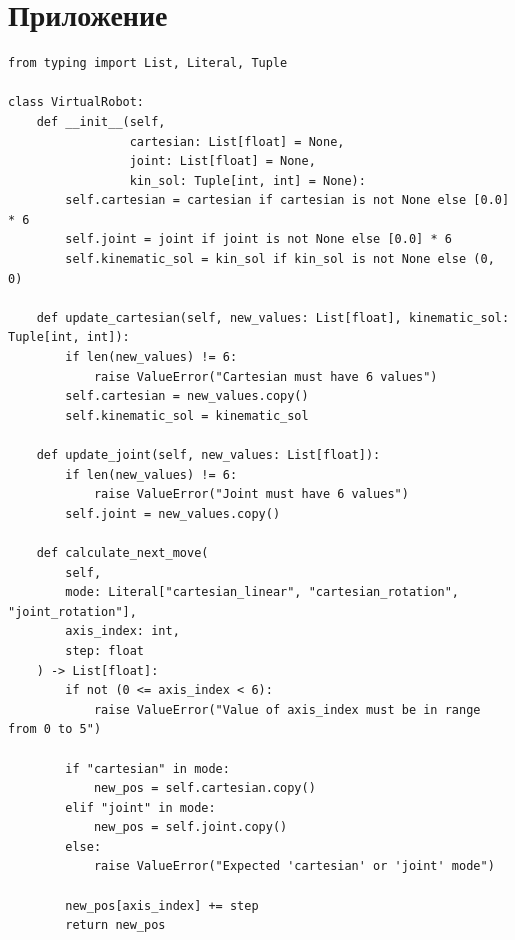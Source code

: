 \documentclass[a4paper,14pt]{extarticle}
\begin{document}
\section{Приложение}
\begin{lstlisting}[label=lst:virtualrobot, caption={Скрипт виртуального робота: сохранение координат робота и кинематической пары. Вычисление следующих координат по индексу и шагу.}]
from typing import List, Literal, Tuple

class VirtualRobot:
    def __init__(self,
                 cartesian: List[float] = None,
                 joint: List[float] = None,
                 kin_sol: Tuple[int, int] = None):
        self.cartesian = cartesian if cartesian is not None else [0.0] * 6
        self.joint = joint if joint is not None else [0.0] * 6
        self.kinematic_sol = kin_sol if kin_sol is not None else (0, 0)

    def update_cartesian(self, new_values: List[float], kinematic_sol: Tuple[int, int]):
        if len(new_values) != 6:
            raise ValueError("Cartesian must have 6 values")
        self.cartesian = new_values.copy()
        self.kinematic_sol = kinematic_sol

    def update_joint(self, new_values: List[float]):
        if len(new_values) != 6:
            raise ValueError("Joint must have 6 values")
        self.joint = new_values.copy()

    def calculate_next_move(
        self,
        mode: Literal["cartesian_linear", "cartesian_rotation", "joint_rotation"],
        axis_index: int,
        step: float
    ) -> List[float]:
        if not (0 <= axis_index < 6):
            raise ValueError("Value of axis_index must be in range from 0 to 5")

        if "cartesian" in mode:
            new_pos = self.cartesian.copy()
        elif "joint" in mode:
            new_pos = self.joint.copy()
        else:
            raise ValueError("Expected 'cartesian' or 'joint' mode")

        new_pos[axis_index] += step
        return new_pos
\end{lstlisting}
\end{document}
